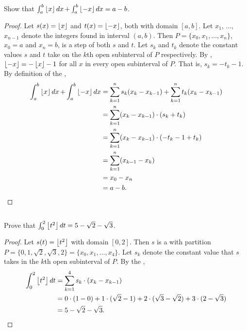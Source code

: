 \documentclass{report}
\begin{document}
Show that
  $\int_a^b \left\lfloor x\right\rfloor \mathop{dx} + \int_a^b \left\lfloor-x\right\rfloor \mathop{dx} = a - b$.

\begin{proof}

  Let $s(x) = \left\lfloor x\right\rfloor$ and $t(x) = \left\lfloor-x\right\rfloor$, both with domain $[a, b]$.
  Let $x_1$, $\ldots$, $x_{n-1}$ denote the integers found in interval $(a, b)$.
  Then $P = \{x_0, x_1, \ldots, x_n\}$, $x_0 = a$ and $x_n = b$, is a step
     of both $s$ and $t$.
  Let $s_k$ and $t_k$ denote the constant values $s$ and $t$ take on the $k$th
    open subinterval of $P$ respectively.
  By , $\left\lfloor-x\right\rfloor = -\left\lfloor x\right\rfloor - 1$ for all $x$
    in every open subinterval of $P$.
  That is, $s_k = -t_k - 1$.
  By definition of the ,
    \begin{align*}
      \int_a^b \left\lfloor x\right\rfloor \mathop{dx} + \int_a^b \left\lfloor-x\right\rfloor \mathop{dx}
        & = \sum_{k=1}^n s_k (x_k - x_{k-1}) +
            \sum_{k=1}^n t_k (x_k - x_{k-1}) \\
        & = \sum_{k=1}^n (x_k - x_{k-1}) \cdot (s_k + t_k) \\
        & = \sum_{k=1}^n (x_k - x_{k-1}) \cdot (-t_k - 1 + t_k) \\
        & = \sum_{k=1}^n (x_{k-1} - x_k) \\
        & = x_0 - x_n \\
        & = a - b.
    \end{align*}

\end{proof}

\subsection{}%
\label{sub:exercise-1.15.5}

\subsubsection{}%
\label{ssub:exercise-1.15.5a}

Prove that $\int_0^2 \left\lfloor t^2\right\rfloor \mathop{dt} = 5 - \sqrt{2} - \sqrt{3}$.

\begin{proof}

  Let $s(t) = \left\lfloor t^2\right\rfloor$ with domain $[0, 2]$.
  Then $s$ is a  with partition
    $P = \{0, 1, \sqrt{2}, \sqrt{3}, 2\} = \{x_0, x_1, \ldots, x_4\}$.
  Let $s_k$ denote the constant value that $s$ takes in the $k$th open
    subinterval of $P$.
  By the ,
    \begin{align*}
      \int_0^2 \left\lfloor t^2\right\rfloor \mathop{dt}
        & = \sum_{k=1}^4 s_k \cdot (x_k - x_{k-1}) \\
        & = 0 \cdot (1 - 0) + 1 \cdot (\sqrt{2} - 1) +
            2 \cdot (\sqrt{3} - \sqrt{2}) + 3 \cdot (2 - \sqrt{3}) \\
        & = 5 - \sqrt{2} - \sqrt{3}.
    \end{align*}

\end{proof}
\end{document}
